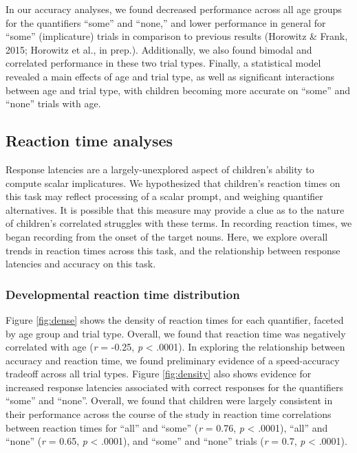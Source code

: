 \documentclass[10pt, letterpaper]{article}
\begin{document}
In our accuracy analyses, we found decreased performance across all age
groups for the quantifiers ``some'' and ``none,'' and lower performance
in general for ``some'' (implicature) trials in comparison to previous
results (Horowitz \& Frank, 2015; Horowitz et al., in prep.).
Additionally, we also found bimodal and correlated performance in these
two trial types. Finally, a statistical model revealed a main effects of
age and trial type, as well as significant interactions between age and
trial type, with children becoming more accurate on ``some'' and
``none'' trials with age.

\subsection{Reaction time analyses}\label{reaction-time-analyses}

Response latencies are a largely-unexplored aspect of children's ability
to compute scalar implicatures. We hypothesized that children's reaction
times on this task may reflect processing of a scalar prompt, and
weighing quantifier alternatives. It is possible that this measure may
provide a clue as to the nature of children's correlated struggles with
these terms. In recording reaction times, we began recording from the
onset of the target nouns. Here, we explore overall trends in reaction
times across this task, and the relationship between response latencies
and accuracy on this task.

\subsubsection{Developmental reaction time
distribution}\label{developmental-reaction-time-distribution}

Figure \ref{fig:dense} shows the density of reaction times for each
quantifier, faceted by age group and trial type. Overall, we found that
reaction time was negatively correlated with age (\emph{r} = -0.25,
\emph{p} \textless{} .0001). In exploring the relationship between
accuracy and reaction time, we found preliminary evidence of a
speed-accuracy tradeoff across all trial types. Figure \ref{fig:density}
also shows evidence for increased response latencies associated with
correct responses for the quantifiers ``some'' and ``none''. Overall, we
found that children were largely consistent in their performance across
the course of the study in reaction time correlations between reaction
times for ``all'' and ``some'' (\emph{r} = 0.76, \emph{p} \textless{}
.0001), ``all'' and ``none'' (\emph{r} = 0.65, \emph{p} \textless{}
.0001), and ``some'' and ``none'' trials (\emph{r} = 0.7, \emph{p}
\textless{} .0001).
\end{document}
